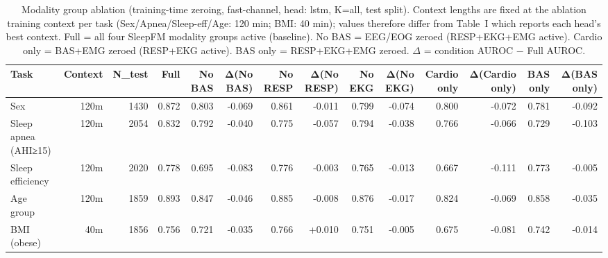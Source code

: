 \begin{table}[ht]
\centering
\caption{Modality group ablation (training-time zeroing, fast-channel, head: lstm, K=all, test split). Context lengths are fixed at the ablation training context per task (Sex/Apnea/Sleep-eff/Age: 120 min; BMI: 40 min); values therefore differ from Table~I which reports each head's best context. Full = all four SleepFM modality groups active (baseline). No BAS = EEG/EOG zeroed (RESP+EKG+EMG active). Cardio only = BAS+EMG zeroed (RESP+EKG active). BAS only = RESP+EKG+EMG zeroed. $\Delta$ = condition AUROC $-$ Full AUROC.}
\label{tab:modality_ablation}
\begin{tabular}{lrrrrrrrrrrrrr}
\toprule
Task & Context & N_test & Full & No BAS & Δ(No BAS) & No RESP & Δ(No RESP) & No EKG & Δ(No EKG) & Cardio only & Δ(Cardio only) & BAS only & Δ(BAS only) \\
\midrule
Sex & 120m & 1430 & 0.872 & 0.803 & -0.069 & 0.861 & -0.011 & 0.799 & -0.074 & 0.800 & -0.072 & 0.781 & -0.092 \\
Sleep apnea (AHI≥15) & 120m & 2054 & 0.832 & 0.792 & -0.040 & 0.775 & -0.057 & 0.794 & -0.038 & 0.766 & -0.066 & 0.729 & -0.103 \\
Sleep efficiency & 120m & 2020 & 0.778 & 0.695 & -0.083 & 0.776 & -0.003 & 0.765 & -0.013 & 0.667 & -0.111 & 0.773 & -0.005 \\
Age group & 120m & 1859 & 0.893 & 0.847 & -0.046 & 0.885 & -0.008 & 0.876 & -0.017 & 0.824 & -0.069 & 0.858 & -0.035 \\
BMI (obese) & 40m & 1856 & 0.756 & 0.721 & -0.035 & 0.766 & +0.010 & 0.751 & -0.005 & 0.675 & -0.081 & 0.742 & -0.014 \\
\bottomrule
\end{tabular}
\end{table}